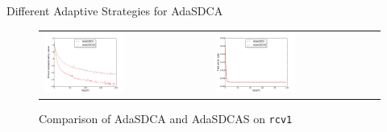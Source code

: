 \begin{frame}{Different Adaptive Strategies for AdaSDCA}
\begin{figure}[htbp]
\begin{tabular}{ll}
    \centering
        \includegraphics[width=0.5\textwidth]{images/two_strategy_SDCA_obej.pdf} &
        \includegraphics[width=0.5\textwidth]{images/two_strategy_SDCA_terror.pdf}
 \end{tabular}
    \caption{Comparison of AdaSDCA and AdaSDCAS on \texttt{rcv1}}
    \label{fig:sgd_on_sdca}
\end{figure}
\end{frame}

